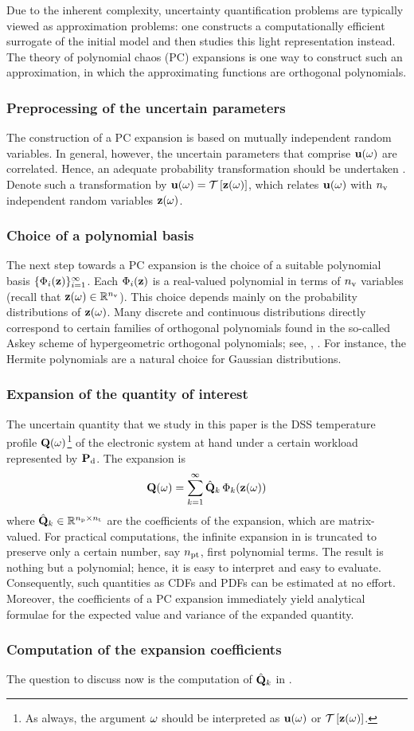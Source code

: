 Due to the inherent complexity, uncertainty quantification problems are typically viewed as approximation problems: one constructs a computationally efficient surrogate of the initial model and then studies this light representation instead.
The theory of polynomial chaos (PC) expansions \cite{maitre2010} is one way to construct such an approximation, in which the approximating functions are orthogonal polynomials.

\subsubsection{Preprocessing of the uncertain parameters}
The construction of a PC expansion is based on mutually independent random variables.
In general, however, the uncertain parameters that comprise $\mathbf{u}(\omega)$ are correlated.
Hence, an adequate probability transformation should be undertaken \cite{eldred2008}.
Denote such a transformation by $\vU(\o) = \oTransform{\vZ(\o)}$, which relates $\mathbf{u}(\omega)$ with ${n_\text{v}}$ independent random variables $\mathbf{z}(\omega)$.

\subsubsection{Choice of a polynomial basis}
The next step towards a PC expansion is the choice of a suitable polynomial basis $\{ \Phi_i(\mathbf{z}) \}_{i = 1}^\infty$.
Each $\Phi_i(\mathbf{z})$ is a real-valued polynomial in terms of ${n_\text{v}}$ variables (recall that $\mathbf{z}(\omega) \in \mathbb{R}^{n_\text{v}}$).
This choice depends mainly on the probability distributions of $\mathbf{z}(\omega)$.
Many discrete and continuous distributions directly correspond to certain families of orthogonal polynomials found in the so-called Askey scheme of hypergeometric orthogonal polynomials; see, \eg, \cite{eldred2008}.
For instance, the Hermite polynomials are a natural choice for Gaussian distributions.

\subsubsection{Expansion of the quantity of interest}
The uncertain quantity that we study in this paper is the DSS temperature profile $\mathbf{Q}(\omega)$\footnote{As always, the argument $\omega$ should be interpreted as $\mathbf{u}(\omega)$ or $\oTransform{\vZ(\o)}$.} of the electronic system at hand under a certain workload represented by $\mathbf{P}_{\text{d}}$.
The expansion is
\begin{equation} \elabel{polynomial-chaos-expansion}
  \mQ(\o) = \sum_{k = 1}^\infty \pcc{\mQ}_k \, \pcb_k(\vZ(\o))
\end{equation}
where $\hat{\mathbf{Q}}_k \in \mathbb{R}^{{n_\text{p}} \times {n_\text{t}}}$ are the coefficients of the expansion, which are matrix-valued.
For practical computations, the infinite expansion in  is truncated to preserve only a certain number, say ${n_\text{pt}}$, first polynomial terms.
The result is nothing but a polynomial; hence, it is easy to interpret and easy to evaluate.
Consequently, such quantities as CDFs and PDFs can be estimated at no effort.
Moreover, the coefficients of a PC expansion immediately yield analytical formulae for the expected value and variance of the expanded quantity.

\subsubsection{Computation of the expansion coefficients}
The question to discuss now is the computation of $\hat{\mathbf{Q}}_k$ in .

